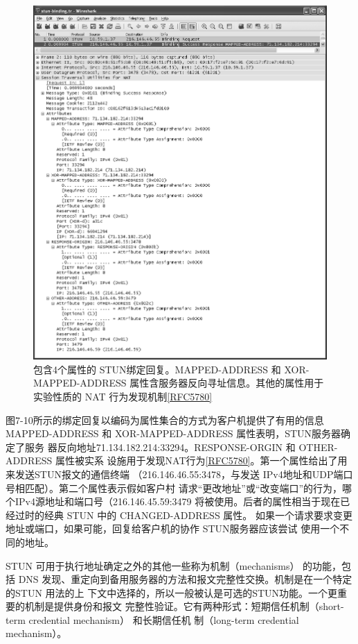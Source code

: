 \begin{figure}[H]
    \centering
	\includegraphics[scale=0.5]{imgs/7/7-10.png}
	\caption{包含4个属性的 STUN绑定回复。MAPPED-ADDRESS 和 XOR-MAPPED-ADDRESS 属性含服务器反向寻址信息。其他的属性用于实验性质的 NAT 行为发现机制\href{https://www.rfc-editor.org/rfc/rfc5780}{[RFC5780]}}
\end{figure}

图7-10所示的绑定回复以编码为属性集合的方式为客户机提供了有用的信息
MAPPED-ADDRESS 和 XOR-MAPPED-ADDRESS 属性表明，STUN服务器确定了服务
器反向地址71.134.182.214:33294。RESPONSE-ORGIN 和 OTHER-ADDRESS 属性被实系
设施用于发现NAT行为\href{https://www.rfc-editor.org/rfc/rfc5780}{[RFC5780]}。第一个属性给出了用来发送STUN报文的通信终端
（216.146.46.55:3478，与发送 IPv4地址和UDP端口号相匹配）。第二个属性表示假如客户村
请求“更改地址”或“改变端口”的行为，哪个IPv4源地址和端口号（216.146.45.59:3479
将被使用。后者的属性相当于现在已经过时的经典 STUN 中的 CHANGED-ADDRESS 属性。
如果一个请求要求变更地址或端口，如果可能，回复给客户机的协作 STUN服务器应该尝试
使用一个不同的地址。

STUN 可用于执行地址确定之外的其他一些称为机制（mechanisms） 的功能，包括 DNS
发现、重定向到备用服务器的方法和报文完整性交换。机制是在一个特定的STUN 用法的上
下文中选择的，所以一般被认是可选的STUN功能。一个更重要的机制是提供身份和报文
完整性验证。它有两种形式：短期信任机制（short-term credential mechanism） 和长期信任机
制（long-term credential mechanism）。

